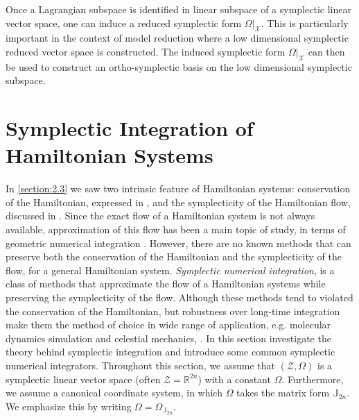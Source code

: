 Once a Lagrangian subspace is identified in linear subspace of a symplectic linear vector space, one can induce a reduced symplectic form $\Omega|_{\mathcal X}$. This is particularly important in the context of model reduction where a low dimensional symplectic reduced vector space is constructed. The induced symplectic form $\Omega|_{\mathcal X}$ can then be used to construct an ortho-symplectic basis on the low dimensional symplectic subspace.

\section{Symplectic Integration of Hamiltonian Systems}
In \cref{section:2.3} we saw two intrinsic feature of Hamiltonian systems: conservation of the Hamiltonian, expressed in , and the symplecticity of the Hamiltonian flow, discussed in . Since the exact flow of a Hamiltonian system is not always available, approximation of this flow has been a main topic of study, in terms of geometric numerical integration \cite{hairer2006geometric,blanes2016concise}. However, there are no known methods that can preserve both the conservation of the Hamiltonian and the symplecticity of the flow, for a general Hamiltonian system. \emph{Symplectic numerical integration}, is a class of methods that approximate the flow of a Hamiltonian systems while preserving the symplecticity of the flow. Although these methods tend to violated the conservation of the Hamiltonian, but robustness over long-time integration make them the method of choice in wide range of application, e.g. molecular dynamics simulation \cite{farantos2014nonlinear} and celestial mechanics, \cite{schutz2004statistical}. In this section investigate the theory behind symplectic integration and introduce some common symplectic numerical integrators. Throughout this section, we assume that $(\mathcal Z, \Omega)$ is a symplectic linear vector space (often $\mathcal Z = \mathbb R^{2n}$) with a constant $\Omega$. Furthermore, we assume a canonical coordinate system, in which $\Omega$ takes the matrix form $\mathbb J_{2n}$. We emphasize this by writing $\Omega = \Omega_{\mathbb J_{2n}}$.

